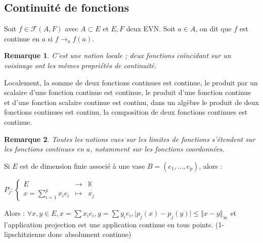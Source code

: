 \documentclass[a4paper,12pt]{book}
\newcommand{\Def}[2]{\begin{tcolorbox}[sharp corners, colback=white,colframe=blue!90!black!75, title=Définition : #1]#2\end{tcolorbox}}
\newcommand{\Prop}[2]{\begin{tcolorbox}[sharp corners, colback=white,colframe=red!90!black!75, title=Proposition : #1]#2\end{tcolorbox}}
\newtheorem{Rem}{Remarque}[section]
\def\K{\mathbb{K}}
\begin{document}
\subsection{Continuité de fonctions}
\Def{Continuité}{Soit $f\in\mathcal{F}(A,F)$ avec $A\subset E$ et $E,F$ deux EVN. Soit $a\in A$, on dit que $f$ est continue en $a$ si $f\to_a f(a)$.}
\begin{Rem}
C'est une notion locale ; deux fonctions coïncidant sur un voisinage ont les mêmes propriétés de continuité.
\end{Rem}
\Prop{Opérations}{Localement, la somme de deux fonctions continues est continue, le produit par un scalaire d'une fonction continue est continue, le produit d'une fonction continue et d'une fonction scalaire continue est continu, dans un algèbre le produit de deux fonctions continues est continu, la composition de deux fonctions continues est continue.}
\begin{Rem}
Toutes les notions vues sur les limites de fonctions s'étendent sur les fonctions continues en $a$, notamment sur les fonctions coordonnées.
\end{Rem}
\Prop{}{Si $E$ est de dimension finie associé à une vase $B=(e_1,...,e_p)$, alors :
\par \begin{center} $P_j:\left\{\begin{array}{rcl} E & \to & \K \\ x=\sum\limits_{i=1}^px_ie_i & \mapsto & x_j \end{array}\right.$\end{center}
\par Alors : $\forall x,y\in E, x=\sum x_ie_i, y=\sum y_ie_i, \vert p_j(x) - p_j(y)\vert\leq\Vert x-y\Vert_\infty$ et l'application projection est une application continue en tous points. (1-lipschitzienne donc absolument continue)}
\end{document}
